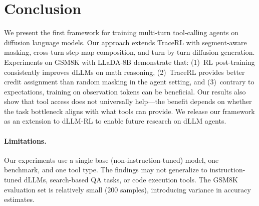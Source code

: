 \documentclass{article}
\begin{document}
\section{Conclusion}

We present the first framework for training multi-turn tool-calling agents on diffusion language models. Our approach extends TraceRL with segment-aware masking, cross-turn step-map composition, and turn-by-turn diffusion generation. Experiments on GSM8K with LLaDA-8B demonstrate that: (1)~RL post-training consistently improves dLLMs on math reasoning, (2)~TraceRL provides better credit assignment than random masking in the agent setting, and (3)~contrary to expectations, training on observation tokens can be beneficial. Our results also show that tool access does not universally help---the benefit depends on whether the task bottleneck aligns with what tools can provide. We release our framework as an extension to dLLM-RL to enable future research on dLLM agents.

\paragraph{Limitations.}
Our experiments use a single base (non-instruction-tuned) model, one benchmark, and one tool type. The findings may not generalize to instruction-tuned dLLMs, search-based QA tasks, or code execution tools. The GSM8K evaluation set is relatively small (200 samples), introducing variance in accuracy estimates.



\end{document}
